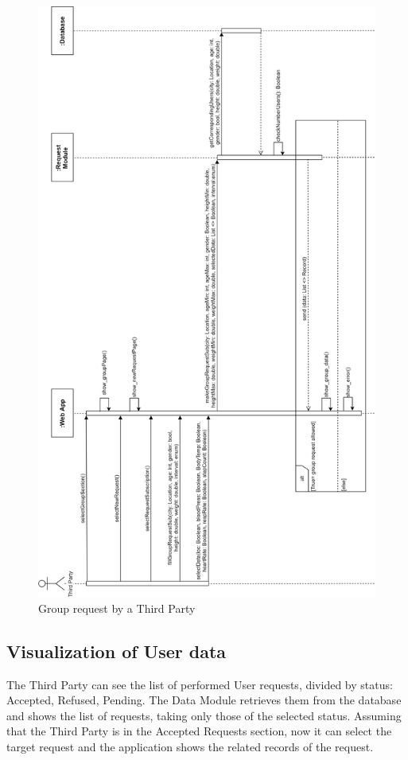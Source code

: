 \begin{figure}[H]

    \centering
    \includegraphics[scale=0.2]{./Pictures/groupRequestSeqDiagDDV.png}
    \caption{Group request by a Third Party}
    
\end{figure}

\subsection{Visualization of User data}
The Third Party can see the list of performed User requests, divided by status: Accepted, Refused, Pending. The Data Module retrieves them from the database and shows the list of requests, taking only those of the selected status. Assuming that the Third Party is in the Accepted Requests section, now it can select the target request and the application shows the related records of the request.

